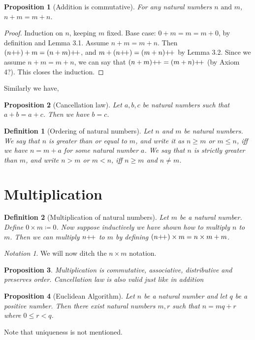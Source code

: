 \documentclass[12pt]{article}
\newtheorem{proposition}{Proposition}[section]
\newtheorem{definition}{Definition}[section]
\theoremstyle{remark}
\newtheorem*{notation}{Notation}
\begin{document}
\begin{proposition}[Addition is commutative]
	For any natural numbers $ n \text{ and } m $, $ n+m = m+n $.
\end{proposition}

\begin{proof}
    Induction on $ n $, keeping $ m $ fixed. Base case: $ 0+m = m = m+0 $, by definition and Lemma 3.1. Assume $ n+m = m+n $. Then $ (n\inc) + m = (n+m)\inc $, and $ m+(n\inc) = (m+n)\inc $ by Lemma 3.2. Since we assume $n+m = m+n$, we can say that $ (n+m)\inc = (m+n)\inc $ (by Axiom 4?). This closes the induction.
\end{proof}

Similarly we have, 

\begin{proposition}[Cancellation law]
    Let $ a, b, c $ be natural numbers such that $ a+b=a+c $. Then we have $ b=c $.
\end{proposition}

\begin{definition}[Ordering of natural numbers]
    Let $ n $ and $ m $ be natural numbers. We say that $ n $ is \textit{greater than or equal to} $ m $, and write it as $ n \geq m $ or $ m \leq n $, iff we have $ n  = m + a $ for some natural number $ a $. We say that $ n $ is \textit{strictly greater than } $ m $, and write $ n > m $ or $ m < n $, iff $ n \geq m $ and $ n \neq m $.
\end{definition}


\section{Multiplication}%
\label{sec:Multiplication}

\begin{definition}[Multiplication of natural numbers]
	Let $ m $ be a natural number. Define $ 0 \times m \coloneqq 0 $. Now suppose inductively we have shown how to multiply $ n $ to $ m $. Then we can multiply $ n\inc $ to $ m $ by defining $ (n\inc) \times m = n \times m + m $.
\end{definition}

\begin{notation}
	We will now ditch the $ n \times m $ notation. 
\end{notation}

\begin{proposition}
    Multiplication is commutative, associative, distributive and preserves order. Cancellation law is also valid just like in addition
\end{proposition}

\begin{proposition}[Euclidean Algorithm]
    Let $ n $ be a natural number and let $ q $ be a positive number. Then there exist natural numbers $ m, r $ such that $ n = mq + r $ where $ 0 \leq r < q $.
\end{proposition}

Note that uniqueness is not mentioned. 
\end{document}
